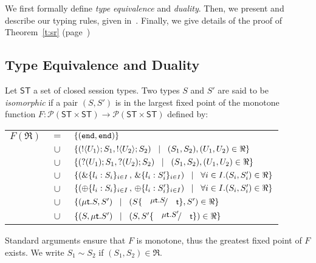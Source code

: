 We first formally define 
\emph{type equivalence} and 
\emph{duality}. 
Then, we  present and describe our typing rules, given in~.
Finally, we give details of the proof of Theorem~\ref{t:sr} (page~\pageref{t:sr}) 


\subsection{Type Equivalence and Duality}
\begin{definition}
\label{def:iso}
Let $\mathsf{ST}$ a set of closed session types. 
Two types $S$ and $S'$ are said to be {\em isomorphic} if a pair $(S,S')$ is 
in the largest fixed point of the monotone function
$F:\mathcal{P}(\mathsf{ST}\times \mathsf{ST}) \to 
\mathcal{P}(\mathsf{ST}\times \mathsf{ST})$ defined by: \\
\begin{tabular}{rcl}
$F(\Re)$ &$\!\!=\!\!$&	$\{(\mathtt{end}, \mathtt{end})\}$\\
         &$\!\!\cup\!\!$&	$\{(! \langle U_1 \rangle ; S_1, ! \langle U_2 \rangle ; S_2)
\;\;\;|\;\;\; (S_1, S_2),(U_1, U_2)\in \Re\}$\\ 
       &$\!\!\cup\!\!$&	$\{(? (U_1) ; S_1, ? (U_2) ; S_2)
\;\;\;|\;\;\;(S_1, S_2),(U_1, U_2)\in \Re\}$\\ 
	&$\!\!\cup\!\!$&	$\{(\& \{l_i: S_i\}_{i \in I} \,,\, \& \{l_i: S_i'\}_{i \in I}) \;\;\;|\;\;\; \forall i\in I. (S_i, S_i')\in \Re\}$\\
	&$\!\!\cup\!\!$&	$\{(\oplus \{l_i: S_i\}_{i \in I}\,,\, \oplus \{l_i: S_i'\}_{i \in I}) \;\;\;|\;\;\; \forall i\in I. (S_i, S_i')\in \Re\}$\\
	&$\!\!\cup\!\!$&	$\set{(\trec{t}{S}, S')
\bnfbar (S\subst{\trec{t}{S}}{\vart{t}},S')\in \Re}$\\
	&$\!\!\cup\!\!$&	$\set{(S,\trec{t}{S'})
\bnfbar (S,S'\subst{\trec{t}{S'}}{\vart{t}})\in \Re}$
\end{tabular}
	
\noindent
Standard arguments ensure that $F$ is monotone, thus the greatest fixed point
of $F$ exists. We write $S_1 \sim S_2$ if  $(S_1,S_2)\in \Re$. 
\end{definition}

\smallskip 

